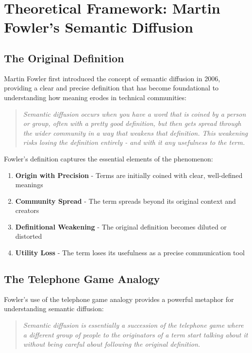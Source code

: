 \documentclass[11pt]{article}
\begin{document}
\section{Theoretical Framework: Martin Fowler's Semantic Diffusion}

\subsection{The Original Definition}

Martin Fowler first introduced the concept of semantic diffusion in 2006, providing a clear and precise definition that has become foundational to understanding how meaning erodes in technical communities:

\begin{quote}
\emph{Semantic diffusion occurs when you have a word that is coined by a person or group, often with a pretty good definition, but then gets spread through the wider community in a way that weakens that definition. This weakening risks losing the definition entirely - and with it any usefulness to the term.}
\end{quote}

Fowler's definition captures the essential elements of the phenomenon:

\begin{enumerate}
\item \textbf{Origin with Precision} - Terms are initially coined with clear, well-defined meanings
\item \textbf{Community Spread} - The term spreads beyond its original context and creators
\item \textbf{Definitional Weakening} - The original definition becomes diluted or distorted
\item \textbf{Utility Loss} - The term loses its usefulness as a precise communication tool
\end{enumerate}

\subsection{The Telephone Game Analogy}

Fowler's use of the telephone game analogy provides a powerful metaphor for understanding semantic diffusion:

\begin{quote}
\emph{Semantic diffusion is essentially a succession of the telephone game where a different group of people to the originators of a term start talking about it without being careful about following the original definition.}
\end{quote}
\end{document}
